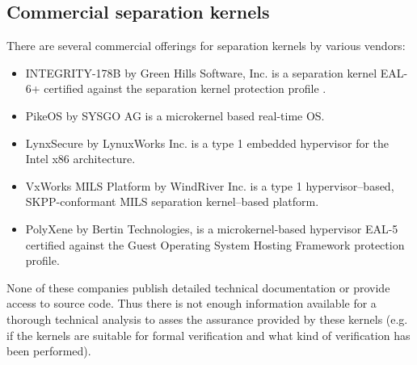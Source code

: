 \subsection{Commercial separation kernels}\label{subsec:commercial-sks}
There are several commercial offerings for separation kernels by various
vendors:

\begin{itemize}
	\item INTEGRITY-178B by Green Hills Software, Inc. is a separation kernel
		EAL-6+ certified against the separation kernel protection profile
		\cite{SKPP}.
	\item PikeOS by SYSGO AG is a microkernel based real-time OS.
	\item LynxSecure by LynuxWorks Inc. is a type 1 embedded hypervisor for the
		Intel x86 architecture.
	\item VxWorks MILS Platform by WindRiver Inc. is a type 1 hypervisor–based,
		SKPP-conformant MILS separation kernel–based platform.
	\item PolyXene by Bertin Technologies, is a microkernel-based hypervisor
		EAL-5 certified against the Guest Operating System Hosting Framework
		protection profile.
\end{itemize}

None of these companies publish detailed technical documentation or provide
access to source code. Thus there is not enough information available for a
thorough technical analysis to asses the assurance provided by these kernels
(e.g. if the kernels are suitable for formal verification and what kind of
verification has been performed).
